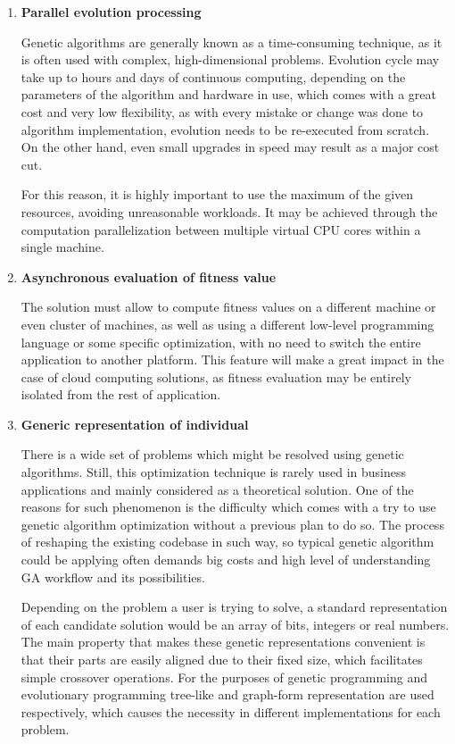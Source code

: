 \begin{enumerate}
\item \label{freq:par} \textbf{Parallel evolution processing}

Genetic algorithms are generally known as a time-consuming technique, as it is often used with complex, high-dimensional problems. Evolution cycle may take up to hours and days of continuous computing, depending on the parameters of the algorithm and hardware in use, which comes with a great cost and very low flexibility, as with every mistake or change was done to algorithm implementation, evolution needs to be re-executed from scratch. On the other hand, even small upgrades in speed may result as a major cost cut.

For this reason, it is highly important to use the maximum of the given resources, avoiding unreasonable workloads. It may be achieved through the computation parallelization between multiple virtual CPU cores within a single machine.
\medbreak

\item \label{freq:async} \textbf{Asynchronous evaluation of fitness value}

The solution must allow to compute fitness values on a different machine or even cluster of machines, as well as using a different low-level programming language or some specific optimization, with no need to switch the entire application to another platform. This feature will make a great impact in the case of cloud computing solutions, as fitness evaluation may be entirely isolated from the rest of application.
\medbreak

\item \label{freq:generic} \textbf{Generic representation of individual}

There is a wide set of problems which might be resolved using genetic algorithms. Still, this optimization technique is rarely used in business applications and mainly considered as a theoretical solution. One of the reasons for such phenomenon is the difficulty which comes with a try to use genetic algorithm optimization without a previous plan to do so. The process of reshaping the existing codebase in such way, so typical genetic algorithm could be applying often demands big costs and high level of understanding GA workflow and its possibilities.

Depending on the problem a user is trying to solve, a standard representation of each candidate solution would be an array of bits, integers or real numbers. The main property that makes these genetic representations convenient is that their parts are easily aligned due to their fixed size, which facilitates simple crossover operations. For the purposes of genetic programming and evolutionary programming tree-like and graph-form representation are used respectively, which causes the necessity in different implementations for each problem.


\end{enumerate}
